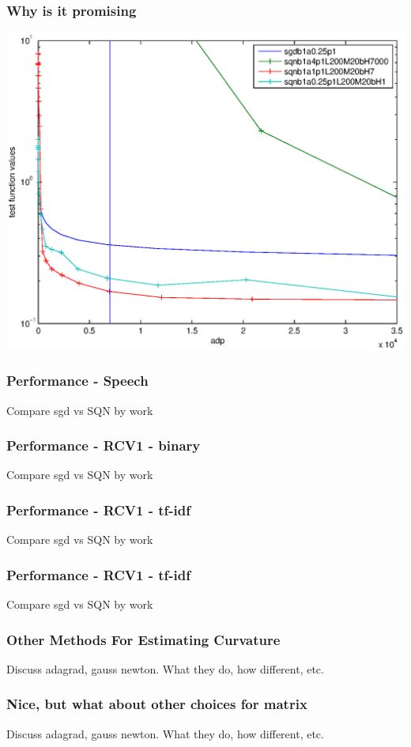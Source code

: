 \documentclass{beamer}
\begin{document}
\begin{frame}
	\frametitle{Why is it promising}
				\includegraphics[scale=0.4]{figures/P02b.eps}
\end{frame}
\begin{frame}
	\frametitle{Performance - Speech}
	Compare sgd vs SQN by work
\end{frame}
\begin{frame}
	\frametitle{Performance - RCV1 - binary}
	Compare sgd vs SQN by work
\end{frame}
\begin{frame}
	\frametitle{Performance - RCV1 - tf-idf}
	Compare sgd vs SQN by work
\end{frame}
\begin{frame}
	\frametitle{Performance - RCV1 - tf-idf}
	Compare sgd vs SQN by work
\end{frame}

\begin{frame}
	\frametitle{Other Methods For Estimating Curvature}
	Discuss adagrad, gauss newton. What they do, how different, etc.
\end{frame}


\begin{frame}
	\frametitle{Nice, but what about other choices for matrix}
	Discuss adagrad, gauss newton. What they do, how different, etc.
\end{frame}
\end{document}
